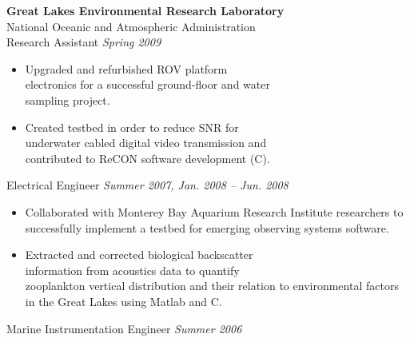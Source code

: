 \documentclass[11pt, twoside, a4paper]{article}
\begin{document}
{\begin{multicols}{2}
                \textbf{Great Lakes Environmental Research Laboratory}\\
                National Oceanic and Atmospheric Administration\\
                Research Assistant \hfill \textsl{Spring 2009} \\
                \vspace{ -10px}
                \begin{itemize}[noitemsep,nolistsep]
                	\item Upgraded and refurbished ROV platform \\electronics for a successful ground-floor and water \\sampling project.
                	\item Created testbed in order to reduce SNR for \\underwater cabled digital video transmission and \\contributed to ReCON software development (C).
                \end{itemize}
                \vspace{5px}
                Electrical Engineer  \hfill \textsl{Summer 2007, Jan. 2008 -- Jun. 2008}  \\
                \vspace{ -10px}	
                \begin{itemize}[noitemsep,nolistsep]
                	\item Collaborated with Monterey Bay Aquarium Research Institute researchers to successfully implement a testbed for emerging observing systems software.
                	\item Extracted and corrected biological backscatter \\information from acoustics data to quantify \\zooplankton vertical distribution and their relation to environmental factors in the Great Lakes using Matlab and C.
                \end{itemize}
                \vspace{5px}
                Marine Instrumentation Engineer \hfill \textsl{Summer 2006} \\
                \vspace{ -10px}	

\end{multicols}}
\end{document}
